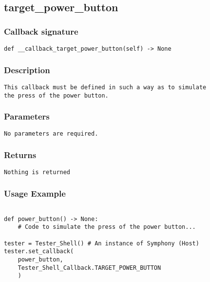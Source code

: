 \subsection{target\_power\_button}

\subsubsection{Callback signature}
\begin{lstlisting}
def __callback_target_power_button(self) -> None
\end{lstlisting}

\subsubsection{Description}
\begin{lstlisting}[mathescape=true, keywordstyle=\color{black}, showstringspaces=false]
This callback must be defined in such a way as to simulate 
the press of the power button. 
\end{lstlisting}

\subsubsection{Parameters}
\begin{lstlisting}[mathescape=true, keywordstyle=\color{black}]
No parameters are required.
\end{lstlisting}

\subsubsection{Returns}
\begin{lstlisting}[mathescape=true, keywordstyle=\color{black}]
Nothing is returned
\end{lstlisting}

\subsubsection{Usage Example}
\begin{lstlisting}

def power_button() -> None:
    # Code to simulate the press of the power button...

tester = Tester_Shell() # An instance of Symphony (Host)
tester.set_callback(
    power_button,
    Tester_Shell_Callback.TARGET_POWER_BUTTON
    )
\end{lstlisting}
